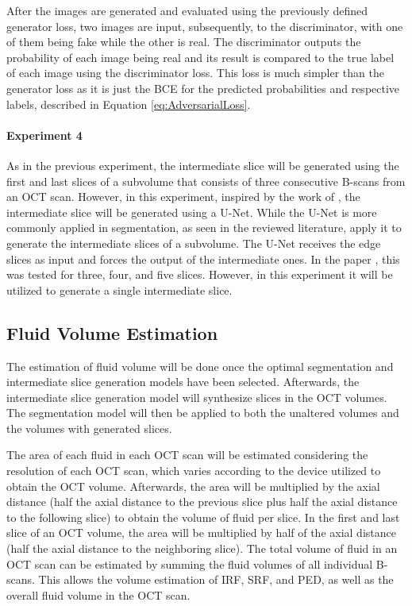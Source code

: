 After the images are generated and evaluated using the previously defined generator loss, two images are input, subsequently, to the discriminator, with one of them being fake while the other is real. The discriminator outputs the probability of each image being real and its result is compared to the true label of each image using the discriminator loss. This loss is much simpler than the generator loss as it is just the BCE for the predicted probabilities and respective labels, described in Equation \ref{eq:AdversarialLoss}.

\paragraph{Experiment 4}
As in the previous experiment, the intermediate slice will be generated using the first and last slices of a subvolume that consists of three consecutive B-scans from an OCT scan. However, in this experiment, inspired by the work of \textcite{Nishimoto2024}, the intermediate slice will be generated using a U-Net. While the U-Net is more commonly applied in segmentation, as seen in the reviewed literature, \textcite{Nishimoto2024} apply it to generate the intermediate slices of a subvolume. The U-Net receives the edge slices as input and forces the output of the intermediate ones. In the paper \parencite{Nishimoto2024}, this was tested for three, four, and five slices. However, in this experiment it will be utilized to generate a single intermediate slice.

\subsection{Fluid Volume Estimation}
The estimation of fluid volume will be done once the optimal segmentation and intermediate slice generation models have been selected. Afterwards, the intermediate slice generation model will synthesize slices in the OCT volumes. The segmentation model will then be applied to both the unaltered volumes and the volumes with generated slices. 
\par
The area of each fluid in each OCT scan will be estimated considering the resolution of each OCT scan, which varies according to the device utilized to obtain the OCT volume. Afterwards, the area will be multiplied by the axial distance (half the axial distance to the previous slice plus half the axial distance to the following slice) to obtain the volume of fluid per slice. In the first and last slice of an OCT volume, the area will be multiplied by half of the axial distance (half the axial distance to the neighboring slice). The total volume of fluid in an OCT scan can be estimated by summing the fluid volumes of all individual B-scans. This allows the volume estimation of IRF, SRF, and PED, as well as the overall fluid volume in the OCT scan.

